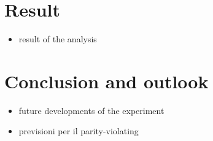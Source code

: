 \chapter{Result}

\begin{itemize}
\item result of the analysis
\end{itemize}



\chapter{Conclusion and outlook} \label{conclusion}

\begin{itemize}
\item future developments of the experiment
\item previsioni per il parity-violating
\end{itemize}